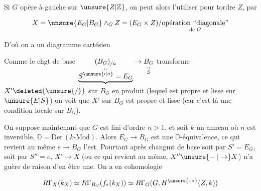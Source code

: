 
Si $G$ opère à gauche sur $\unsure{Z|\mathbb Z}$, on peut alors l'utiliser pour tordre $Z$, par

\[
X=\unsure{E_G|B_G}\wedge_G Z=(E_G\times Z)/\underset{\text{de }G}{\text{opération ``diagonale''}}
\]

D'où on a un diagramme cartésien


 Comme le chgt de base $\underset{\substack{\shortparallel\\\underbrace{S^{\unsure{\prime|\prime\prime}}=E_G}}}{(B_G)_{/a}}\to\underset{\substack{\shortparallel\\ S}}{B_G}$ transforme $X'\deleted{\unsure{/}}$ sur $B_G$ en produit (lequel est  propre et lisse sur $\unsure{E|S}$) on voit que $X'$ sur $B_G$ est  propre et lisse (car c'est là une condition locale sur $B_G$).

\unsure{\S}

On suppose maintenant que $G$ est fini d'ordre $n>1$, et soit $k$ un anneau où $n$ est inversible,  $\mathbb D=\mathrm{Der}\,(k\text{-}\mathrm{Mod})$. Alors $E_G\to B_G$ est une $\mathbb D$-équivalence,  ce  qui revient au même $e\to B_G$ \unsure{:} l'est. Pourtant après changmt de base soit par $S'=E_G$, soit par $S''=e$,  $X'\to X$ (ou ce qui revient au même, $X''\unsure{\relbar|\to} X$) n'a  guère de raison d'en être une. On a en cohomologie


\[
R\Gamma_X(k_X)\simeq R\Gamma_{B_G}(f_*(k_X))\simeq R\Gamma_G(G,H^{\unsure{\cdot|*}}(Z,k))
\]

